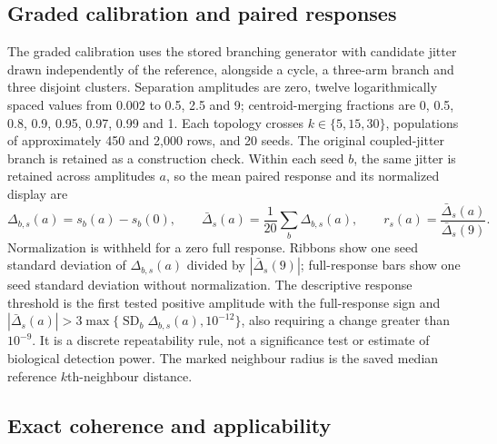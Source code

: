 \documentclass[11pt]{article}
\begin{document}
\subsection{Graded calibration and paired responses}

The graded calibration uses the stored branching generator with candidate jitter drawn independently of the reference, alongside a cycle, a three-arm branch and three disjoint clusters. Separation amplitudes are zero, twelve logarithmically spaced values from 0.002 to 0.5, 2.5 and 9; centroid-merging fractions are 0, 0.5, 0.8, 0.9, 0.95, 0.97, 0.99 and 1. Each topology crosses $k\in\{5,15,30\}$, populations of approximately 450 and 2,000 rows, and 20 seeds. The original coupled-jitter branch is retained as a construction check. Within each seed $b$, the same jitter is retained across amplitudes $a$, so the mean paired response and its normalized display are
\begin{equation}
 \Delta_{b,s}(a)=s_b(a)-s_b(0),\qquad
 \bar\Delta_s(a)=\frac{1}{20}\sum_b\Delta_{b,s}(a),\qquad
 r_s(a)=\frac{\bar\Delta_s(a)}{\bar\Delta_s(9)}.
\end{equation}
Normalization is withheld for a zero full response. Ribbons show one seed standard deviation of $\Delta_{b,s}(a)$ divided by $|\bar\Delta_s(9)|$; full-response bars show one seed standard deviation without normalization. The descriptive response threshold is the first tested positive amplitude with the full-response sign and $|\bar\Delta_s(a)|>3\max\{\operatorname{SD}_b\Delta_{b,s}(a),10^{-12}\}$, also requiring a change greater than $10^{-9}$. It is a discrete repeatability rule, not a significance test or estimate of biological detection power. The marked neighbour radius is the saved median reference $k$th-neighbour distance.

\subsection{Exact coherence and applicability}
\end{document}
